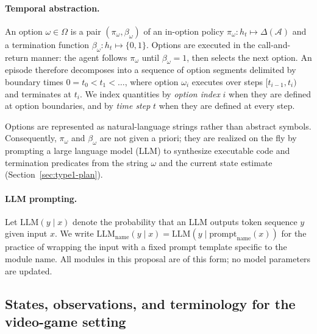 \documentclass[11pt]{article}
\newcommand{\llm}[1]{\mathrm{LLM}_{\mathrm{#1}}}
\newcommand{\calA}{\mathcal{A}}
\begin{document}
\paragraph{Temporal abstraction.}
An option $\omega\in\Omega$ is a pair $(\pi_\omega,\beta_\omega)$ of an in-option policy $\pi_\omega:h_t\mapsto\Delta(\calA)$ and a termination function $\beta_\omega:h_t\mapsto\{0,1\}$. Options are executed in the call-and-return manner: the agent follows $\pi_\omega$ until $\beta_\omega=1$, then selects the next option. An episode therefore decomposes into a sequence of option segments delimited by boundary times $0=t_0<t_1<\dots$, where option $\omega_i$ executes over steps $[t_{i-1},t_i)$ and terminates at $t_i$. We index quantities by \emph{option index} $i$ when they are defined at option boundaries, and by \emph{time step} $t$ when they are defined at every step.

Options are represented as natural-language strings rather than abstract symbols. Consequently, $\pi_\omega$ and $\beta_\omega$ are not given a priori; they are realized on the fly by prompting a large language model (LLM) to synthesize executable code and termination predicates from the string $\omega$ and the current state estimate (Section~\ref{sec:type1-plan}).

\paragraph{LLM prompting.}
Let $\mathrm{LLM}(y\mid x)$ denote the probability that an LLM outputs token sequence $y$ given input $x$. We write $\llm{name}(y\mid x)=\mathrm{LLM}(y\mid \mathrm{prompt}_{\mathrm{name}}(x))$ for the practice of wrapping the input with a fixed prompt template specific to the module $\mathrm{name}$. All modules in this proposal are of this form; no model parameters are updated.

\subsection{States, observations, and terminology for the video-game setting}
\label{sec:states}
\end{document}
